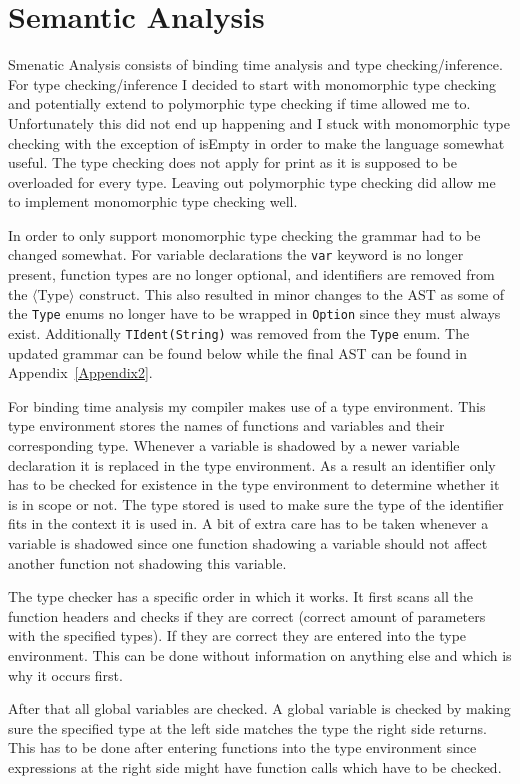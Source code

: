\documentclass{article}
\begin{document}
\section{Semantic Analysis}
Smenatic Analysis consists of binding time analysis and type checking/inference. For type checking/inference I decided to start with monomorphic type checking and potentially extend to polymorphic type checking if time allowed me to. Unfortunately this did not end up happening and I stuck with monomorphic type checking with the exception of isEmpty in order to make the language somewhat useful. The type checking does not apply for print as it is supposed to be overloaded for every type. Leaving out polymorphic type checking did allow me to implement monomorphic type checking well.

In order to only support monomorphic type checking the grammar had to be changed somewhat. For variable declarations the \texttt{var} keyword is no longer present, function types are no longer optional, and identifiers are removed from the $\langle$Type$\rangle$ construct. This also resulted in minor changes to the AST as some of the \texttt{Type} enums no longer have to be wrapped in \texttt{Option} since they must always exist. Additionally \texttt{TIdent(String)} was removed from the \texttt{Type} enum. The updated grammar can be found below while the final AST can be found in Appendix~\ref{Appendix2}.

For binding time analysis my compiler makes use of a type environment. This type environment stores the names of functions and variables and their corresponding type. Whenever a variable is shadowed by a newer variable declaration it is replaced in the type environment. As a result an identifier only has to be checked for existence in the type environment to determine whether it is in scope or not. The type stored is used to make sure the type of the identifier fits in the context it is used in. A bit of extra care has to be taken whenever a variable is shadowed since one function shadowing a variable should not affect another function not shadowing this variable.

The type checker has a specific order in which it works. It first scans all the function headers and checks if they are correct (correct amount of parameters with the specified types). If they are correct they are entered into the type environment. This can be done without information on anything else and which is why it occurs first.

After that all global variables are checked. A global variable is checked by making sure the specified type at the left side matches the type the right side returns. This has to be done after entering functions into the type environment since expressions at the right side might have function calls which have to be checked.
\end{document}
